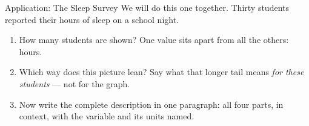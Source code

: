\documentclass[12pt]{article}
\newcommand{\answerspace}[2]{\par\nopagebreak\noindent\begin{minipage}[t][#1][t]{\linewidth}%
  \color{keyred}\bfseries #2\end{minipage}\par}
\begin{document}
\boxguard[14]
\begin{notesbox}{Application: The Sleep Survey}
We will do this one together. Thirty students reported their hours of sleep on a school night.

\vspace{3pt}
\begin{center}
\end{center}
\vspace{2pt}

\begin{enumerate}[label=\textbf{\alph*.}, leftmargin=1.8em, itemsep=4pt]
  \item How many students are shown? \blank{1.8cm} \quad One value sits apart from all the
        others: \blank{2.0cm} hours.
  \item Which way does this picture lean? \blank{3.0cm} \quad Say what that longer tail means
        \emph{for these students} --- not for the graph.
        \answerspace{1.6cm}{}
  \item Now write the complete description in one paragraph: all four parts, in context, with
        the variable and its units named.
        \answerspace{2.4cm}{}
\end{enumerate}
\end{notesbox}
\end{document}
